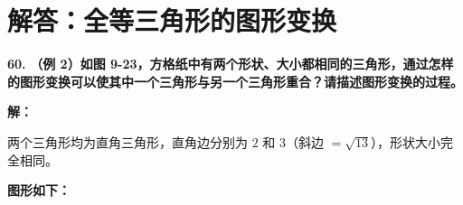 \documentclass[12pt, a4paper]{ctexrep}
\begin{document}
\newpage

\section{解答：全等三角形的图形变换}

\vspace{0.6cm}

\textbf{\LARGE 60.} \textbf{（例 2）如图 9-23，方格纸中有两个形状、大小都相同的三角形，通过怎样的图形变换可以使其中一个三角形与另一个三角形重合？请描述图形变换的过程。}

\vspace{0.4cm}
\textbf{解：}

两个三角形均为直角三角形，直角边分别为 $2$ 和 $3$（斜边 $= \sqrt{13}$），形状大小完全相同。

\textbf{图形如下：}
\end{document}
